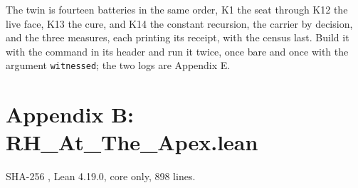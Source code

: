 \documentclass[10pt]{article}
\begin{document}
The twin is fourteen batteries in the same order, K1 the seat through
K12 the live face, K13 the cure, and K14 the constant recursion, the
carrier by decision, and the three measures, each printing its receipt,
with the census last. Build it with the command in its header and run it
twice, once bare and once with the argument \texttt{witnessed}; the two
logs are Appendix E.

\hypertarget{appendix-b-rh_at_the_apex.lean}{%
\section{Appendix B:
RH\_At\_The\_Apex.lean}\label{appendix-b-rh_at_the_apex.lean}}

SHA-256
\texttt{},
Lean 4.19.0, core only, 898 lines.

\begingroup\scriptsize
\end{document}
